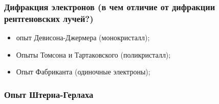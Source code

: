 \subsubsection{Дифракция электронов (в чем отличие от дифракции рентгеновских лучей?)}
\begin{itemize}
  \item опыт Девисона-Джермера (монокристалл);
  \item Опыты Томсона  и Тартаковского (поликристалл);
  \item Опыт Фабриканта (одиночные электроны);
\end{itemize}

\subsubsection{Опыт Штерна-Герлаха}
